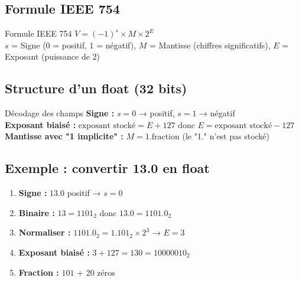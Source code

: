 \documentclass[10pt,a4paper]{article}
\begin{document}
\subsection{Formule IEEE 754}

\begin{definitionbox}{Formule IEEE 754}
$\boxed{V = (-1)^s \times M \times 2^E}$\\[0.2em]
$s$ = Signe (0 = positif, 1 = négatif), $M$ = Mantisse (chiffres significatifs), $E$ = Exposant (puissance de 2)
\end{definitionbox}

\subsection{Structure d'un float (32 bits)}

\begin{center}
\end{center}

\begin{techbox}{Décodage des champs}
\textbf{Signe :} $s = 0$ → positif, $s = 1$ → négatif\\
\textbf{Exposant biaisé :} $\text{exposant stocké} = E + 127$ donc $E = \text{exposant stocké} - 127$\\
\textbf{Mantisse avec "1 implicite" :} $M = 1.\text{fraction}$ (le "1." n'est pas stocké)
\end{techbox}

\subsection{Exemple : convertir 13.0 en float}

\begin{enumerate}
    \item \textbf{Signe :} $13.0$ positif → $s = 0$
    \item \textbf{Binaire :} $13 = 1101_2$ donc $13.0 = 1101.0_2$
    \item \textbf{Normaliser :} $1101.0_2 = 1.101_2 \times 2^3$ → $E = 3$
    \item \textbf{Exposant biaisé :} $3 + 127 = 130 = 10000010_2$
    \item \textbf{Fraction :} $101$ + 20 zéros
\end{enumerate}
\end{document}
